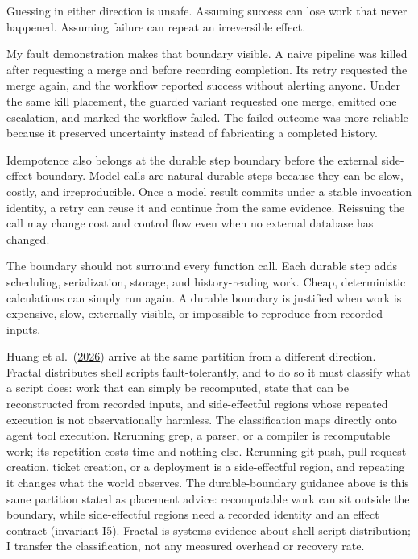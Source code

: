 Guessing in either direction is unsafe. Assuming success can lose work that never happened. Assuming failure can repeat an irreversible effect.

My fault demonstration makes that boundary visible. A naive pipeline was killed after requesting a merge and before recording completion. Its retry requested the merge again, and the workflow reported success without alerting anyone. Under the same kill placement, the guarded variant requested one merge, emitted one escalation, and marked the workflow failed. The failed outcome was more reliable because it preserved uncertainty instead of fabricating a completed history.

Idempotence also belongs at the durable step boundary before the external side-effect boundary. Model calls are natural durable steps because they can be slow, costly, and irreproducible. Once a model result commits under a stable invocation identity, a retry can reuse it and continue from the same evidence. Reissuing the call may change cost and control flow even when no external database has changed.

The boundary should not surround every function call. Each durable step adds scheduling, serialization, storage, and history-reading work. Cheap, deterministic calculations can simply run again. A durable boundary is justified when work is expensive, slow, externally visible, or impossible to reproduce from recorded inputs.

Huang et al.~(\href{https://www.usenix.org/conference/nsdi26/presentation/huang}{2026}) arrive at the same partition from a different direction. Fractal distributes shell scripts fault-tolerantly, and to do so it must classify what a script does: work that can simply be recomputed, state that can be reconstructed from recorded inputs, and side-effectful regions whose repeated execution is not observationally harmless. The classification maps directly onto agent tool execution. Rerunning grep, a parser, or a compiler is recomputable work; its repetition costs time and nothing else. Rerunning git push, pull-request creation, ticket creation, or a deployment is a side-effectful region, and repeating it changes what the world observes. The durable-boundary guidance above is this same partition stated as placement advice: recomputable work can sit outside the boundary, while side-effectful regions need a recorded identity and an effect contract (invariant I5). Fractal is systems evidence about shell-script distribution; I transfer the classification, not any measured overhead or recovery rate.

